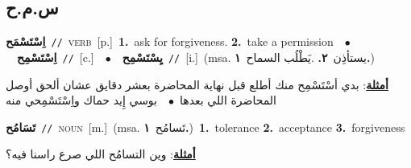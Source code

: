 \documentclass[10pt,a4paper,twoside]{article} %
\begin{document}
\begin{multicols}{2}
\vspace{-3mm}
\subsection*{\color{blue}\foreignlanguage{arabic}{س.م.ح}\color{blue}{}} 

{\setlength\topsep{0pt}\textbf{\foreignlanguage{arabic}{اِسْتَسْمَح}}\ {\color{gray}\texttt{//}\color{black}}\ \textsc{verb}\ [p.]\ \textbf{1.}~ask for forgiveness.  \textbf{2.}~take a permission\ \ $\bullet$\ \ \setlength\topsep{0pt}\textbf{\foreignlanguage{arabic}{اِسْتَسْمِح}}\ {\color{gray}\texttt{//}\color{black}}\ [c.]\ \ $\bullet$\ \ \setlength\topsep{0pt}\textbf{\foreignlanguage{arabic}{يِسْتَسْمِح}}\ {\color{gray}\texttt{//}\color{black}}\ [i.]\ \color{gray}(msa. \foreignlanguage{arabic}{يستأذِن}~\foreignlanguage{arabic}{\textbf{٢.}}  .\foreignlanguage{arabic}{يَطْلُب السماح}~\foreignlanguage{arabic}{\textbf{١.}})\color{black}\  \begin{flushright}\color{gray}\foreignlanguage{arabic}{\textbf{\underline{\foreignlanguage{arabic}{أمثلة}}}: بدي أسْتَسْمِح منك أطلع قبل نهاية المحاضرة بعشر دقايق عشان ألحق أوصل المحاضرة اللي بعدها\ $\bullet$\ \  بوسي إِيد حماك واِسْتَسْمِحي منه}\end{flushright}\color{black}} \vspace{2mm}

{\setlength\topsep{0pt}\textbf{\foreignlanguage{arabic}{تَسَامُح}}\ {\color{gray}\texttt{//}\color{black}}\ \textsc{noun}\ [m.]\ \color{gray}(msa. \foreignlanguage{arabic}{تَسامُح}~\foreignlanguage{arabic}{\textbf{١.}})\color{black}\ \textbf{1.}~tolerance  \textbf{2.}~acceptance  \textbf{3.}~forgiveness\  \begin{flushright}\color{gray}\foreignlanguage{arabic}{\textbf{\underline{\foreignlanguage{arabic}{أمثلة}}}: وين التسامُح اللي صرع راسنا فيه؟}\end{flushright}\color{black}} \vspace{2mm}


\end{multicols}
\end{document}
